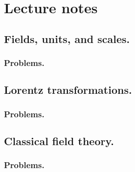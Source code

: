 %
%
\part{Lecture notes}
   \chapter{Fields, units, and scales.}
      
      
      \section{Problems.}
         
         
   \chapter{Lorentz transformations.}
      
      
      \section{Problems.}
         
   \chapter{Classical field theory.}
      
      
      \section{Problems.}
         
         
         
         
